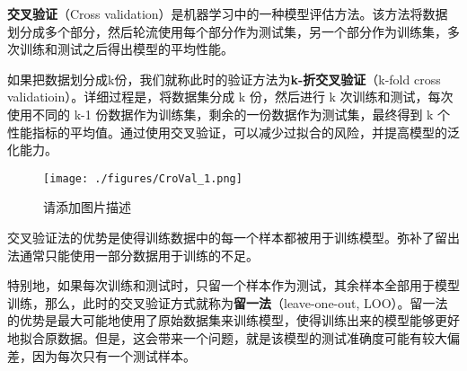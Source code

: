 
\textbf{交叉验证}（Cross validation）是机器学习中的一种模型评估方法。该方法将数据划分成多个部分，然后轮流使用每个部分作为测试集，另一个部分作为训练集，多次训练和测试之后得出模型的平均性能。

如果把数据划分成k份，我们就称此时的验证方法为\textbf{k-折交叉验证}（k-fold cross validatioin）。详细过程是，将数据集分成 k 份，然后进行 k 次训练和测试，每次使用不同的 k-1 份数据作为训练集，剩余的一份数据作为测试集，最终得到 k 个性能指标的平均值。通过使用交叉验证，可以减少过拟合的风险，并提高模型的泛化能力。

\begin{figure}[ht]
\centering
\texttt{[image: ./figures/CroVal\_1.png]}
\caption{请添加图片描述} \label{CroVal_fig1}
\end{figure}

交叉验证法的优势是使得训练数据中的每一个样本都被用于训练模型。弥补了留出法通常只能使用一部分数据用于训练的不足。

特别地，如果每次训练和测试时，只留一个样本作为测试，其余样本全部用于模型训练，那么，此时的交叉验证方式就称为\textbf{留一法}（leave-one-out, LOO）。留一法的优势是最大可能地使用了原始数据集来训练模型，使得训练出来的模型能够更好地拟合原数据。但是，这会带来一个问题，就是该模型的测试准确度可能有较大偏差，因为每次只有一个测试样本。